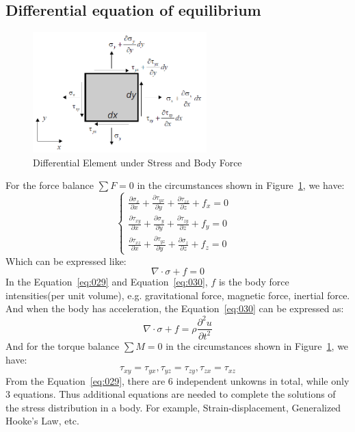\documentclass[en,hazy,cyan,8pt,normal]{elegantnote}
\begin{document}
  \subsection{Differential equation of equilibrium}
    \begin{figure}[H]
      \centering
      \includegraphics[width=0.6\textwidth]{image/009.png}
      \caption{Differential Element under Stress and Body Force}
      \label{fig:009}
    \end{figure}
    For the force balance $\sum F=0$ in the circumstances shown in Figure~\ref{fig:009}, we have:
    \begin{equation}\label{eq:029}
      \begin{cases}
        \displaystyle \frac{\partial\sigma_x}{\partial x}+\frac{\partial\tau_{yx}}{\partial y}+\frac{\partial\tau_{zx}}{\partial z}+f_x=0 \\
        \displaystyle \frac{\partial\tau_{xy}}{\partial x}+\frac{\partial\sigma_y}{\partial y}+\frac{\partial\tau_{zy}}{\partial z}+f_y=0 \\
        \displaystyle \frac{\partial\tau_{xz}}{\partial x}+\frac{\partial\tau_{yz}}{\partial y}+\frac{\partial\sigma_z}{\partial z}+f_z=0 &
      \end{cases}
    \end{equation}
    Which can be expressed like:
    \begin{equation}\label{eq:030}
      \nabla \cdot \sigma + f = 0
    \end{equation}
    In the Equation~\ref{eq:029} and Equation~\ref{eq:030}, $f$ is the body force intensities(per unit volume), e.g. gravitational force, magnetic force, inertial force.\\
    And when the body has acceleration, the Equation~\ref{eq:030} can be expressed as:
    \begin{equation}\label{eq:031}
      \nabla \cdot \sigma + f = \rho \frac{\partial^2 u}{\partial t^2}
    \end{equation}
    And for the torque balance $\sum M=0$ in the circumstances shown in Figure~\ref{fig:009}, we have:
    \begin{equation}\label{eq:032}
        \tau_{xy}=\tau_{yx}, \tau_{yz}=\tau_{zy}, \tau_{zx}=\tau_{xz}
    \end{equation}
    From the Equation~\ref{eq:029}, there are 6 independent unkowns in total, while only 3 equations. Thus additional equations are needed to complete the solutions of the stress distribution in a body. For example, Strain-displacement, Generalized Hooke's Law, etc.
\end{document}
